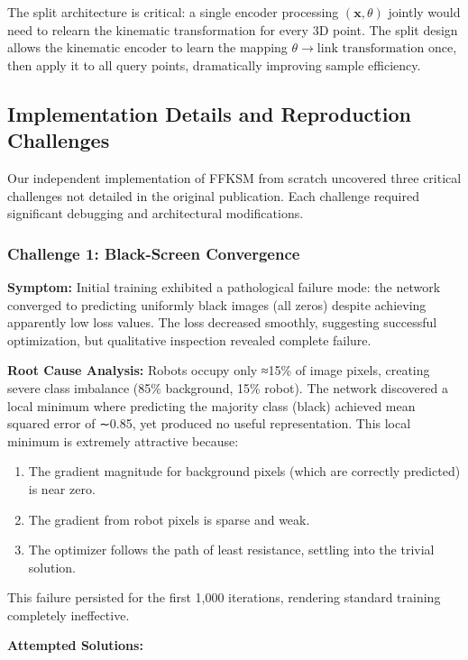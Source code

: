 \documentclass[12pt,a4paper,oneside]{report}
\begin{document}
The split architecture is critical: a single encoder processing $(\mathbf{x}, \theta)$ jointly would need to relearn the kinematic transformation for every 3D point. The split design allows the kinematic encoder to learn the mapping $\theta \rightarrow \text{link transformation}$ once, then apply it to all query points, dramatically improving sample efficiency.

\subsection{Implementation Details and Reproduction Challenges}

Our independent implementation of FFKSM from scratch uncovered three critical challenges not detailed in the original publication. Each challenge required significant debugging and architectural modifications.

\subsubsection{Challenge 1: Black-Screen Convergence}

\textbf{Symptom:} Initial training exhibited a pathological failure mode: the network converged to predicting uniformly black images (all zeros) despite achieving apparently low loss values. The loss decreased smoothly, suggesting successful optimization, but qualitative inspection revealed complete failure.

\textbf{Root Cause Analysis:} Robots occupy only ≈15\% of image pixels, creating severe class imbalance (85\% background, 15\% robot). The network discovered a local minimum where predicting the majority class (black) achieved mean squared error of ∼0.85, yet produced no useful representation. This local minimum is extremely attractive because:

\begin{enumerate}
    \item The gradient magnitude for background pixels (which are correctly predicted) is near zero.
    \item The gradient from robot pixels is sparse and weak.
    \item The optimizer follows the path of least resistance, settling into the trivial solution.
\end{enumerate}

This failure persisted for the first 1,000 iterations, rendering standard training completely ineffective.

\textbf{Attempted Solutions:}
\end{document}
